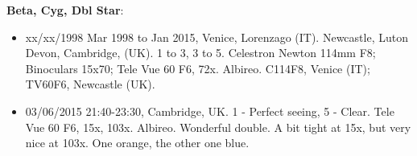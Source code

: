 {\bf Beta, Cyg, Dbl Star}:
\begin{itemize}
\item xx/xx/1998 Mar 1998 to Jan 2015, Venice, Lorenzago (IT). Newcastle, Luton Devon, Cambridge, (UK). 1 to 3, 3 to 5. Celestron Newton 114mm F8; Binoculars 15x70; Tele Vue 60 F6, 72x. Albireo. C114F8, Venice (IT); TV60F6, Newcastle (UK).
\item 03/06/2015 21:40-23:30, Cambridge, UK. 1 - Perfect seeing, 5 - Clear. Tele Vue 60 F6, 15x, 103x. Albireo. Wonderful double. A bit tight at 15x, but very nice at 103x. One orange, the other one blue.
\end{itemize}
